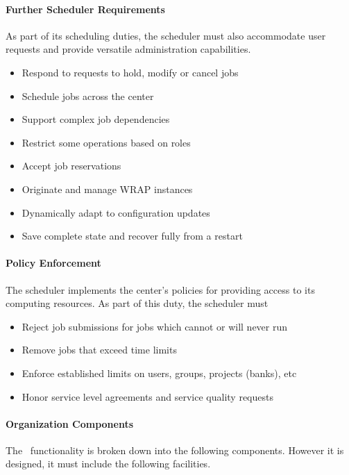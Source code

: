 \paragraph{Further Scheduler Requirements}

As part of its scheduling duties, the scheduler must also accommodate
user requests and provide versatile administration capabilities.

\begin{itemize}
  \item Respond to requests to hold, modify or cancel jobs
  \item Schedule jobs across the center
  \item Support complex job dependencies
  \item Restrict some operations based on roles
  \item Accept job reservations
  \item Originate and manage WRAP instances
  \item Dynamically adapt to configuration updates
  \item Save complete state and recover fully from a restart
\end{itemize}

\paragraph{Policy Enforcement}

The scheduler implements the center's policies for providing access to
its computing resources.  As part of this duty, the scheduler must

\begin{itemize}
  \item Reject job submissions for jobs which cannot or will never run
  \item Remove jobs that exceed time limits
  \item Enforce established limits on users, groups, projects (banks), etc
  \item Honor service level agreements and service quality requests
\end{itemize}

\paragraph{Organization Components}

The \ngjs\ functionality is broken down into the following components.
However it is designed, it must include the following facilities.

